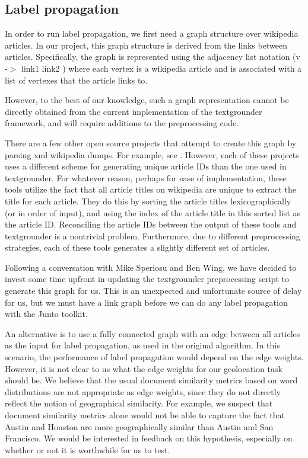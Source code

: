 \subsection{Label propagation}
In order to run label propagation, we first need a graph structure over
wikipedia articles. In our project, this graph structure is derived from the
links between articles. Specifically, the graph is represented using the
adjacency list notation (v -$>$ link1 link2 ) where each vertex is a wikipedia
article and is associated with a list of vertexes that the article links to.

However, to the best of our knowledge, such a graph representation cannot be
directly obtained from the current implementation of the textgrounder
framework, and will require additions to the preprocessing code.

There are a few other open source projects that attempt to create this graph by parsing xml wikipedia dumps.
For example, see \cite{} \cite{} \cite{}.
However, each of these projects uses a different scheme for generating unique article IDs than the one used in textgrounder.
For whatever reason, perhaps for ease of implementation, these tools utilize the fact that all article titles on wikipedia are unique to extract the title for each article.
They do this by sorting the article titles lexicographically (or in order of input), and using the index of the article title in this sorted list as the article ID.
Reconciling the article IDs between the output of these tools and textgrounder is a nontrivial problem.
Furthermore, due to different preprocessing strategies, each of these tools generates a slightly different set of articles.

Following a conversation with Mike Speriosu and Ben Wing, we have decided to
invest some time upfront in updating the textgrounder preprocessing script to
generate this graph for us.
This is an unexpected and unfortunate source of delay for us, but we must have
a link graph before we can do any label propagation with the Junto toolkit.

An alternative is to use a fully connected graph with an edge between all articles as the input for label propagation, as used in the original algorithm.
In this scenario, the performance of label propagation would depend on the edge weights.
However, it is not clear to us what the edge weights for our geolocation task should be.
We believe that the usual document similarity metrics based on word
distributions are not appropriate as edge weights, since they do not directly
reflect the notion of geographical similarity.
For example, we suspect that document similarity metrics alone would not be
able to capture the fact that Austin and Houston are more geographically
similar than Austin and San Francisco.
We would be interested in feedback on this hypothesis, especially on whether or
not it is worthwhile for us to test.
